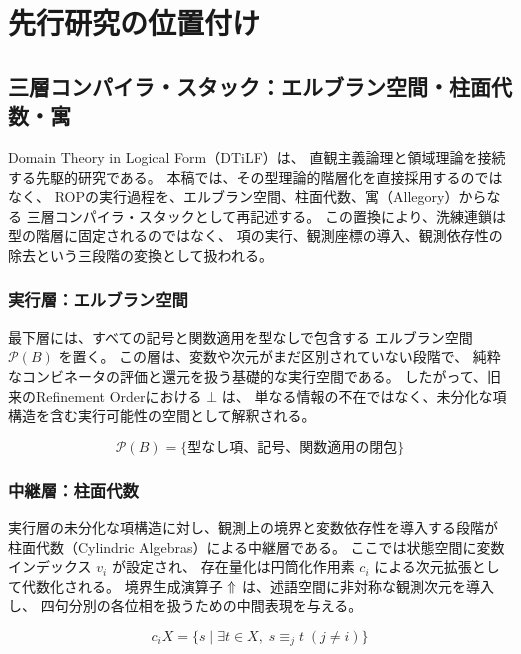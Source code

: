 \documentclass[11pt,a4paper]{ltjsarticle}
\theoremstyle{definition}
\begin{document}
\section{先行研究の位置付け}

\subsection{三層コンパイラ・スタック：エルブラン空間・柱面代数・寓}

Domain Theory in Logical Form（DTiLF）\cite{Abramsky1991}は、
直観主義論理と領域理論を接続する先駆的研究である。
本稿では、その型理論的階層化を直接採用するのではなく、
ROPの実行過程を、エルブラン空間、柱面代数、寓（Allegory）からなる
三層コンパイラ・スタックとして再記述する。
この置換により、洗練連鎖は型の階層に固定されるのではなく、
項の実行、観測座標の導入、観測依存性の除去という三段階の変換として扱われる。

\subsubsection{実行層：エルブラン空間}

最下層には、すべての記号と関数適用を型なしで包含する
エルブラン空間 $\mathcal{P}(B)$ を置く。
この層は、変数や次元がまだ区別されていない段階で、
純粋なコンビネータの評価と還元を扱う基礎的な実行空間である。
したがって、旧来のRefinement Orderにおける $\bot$ は、
単なる情報の不在ではなく、未分化な項構造を含む実行可能性の空間として解釈される。

\begin{equation}
\mathcal{P}(B) = \{\text{型なし項、記号、関数適用の閉包}\}
\end{equation}

\subsubsection{中継層：柱面代数}

実行層の未分化な項構造に対し、観測上の境界と変数依存性を導入する段階が
柱面代数（Cylindric Algebras）による中継層である。
ここでは状態空間に変数インデックス $v_i$ が設定され、
存在量化は円筒化作用素 $c_i$ による次元拡張として代数化される。
境界生成演算子 $\Uparrow$ は、述語空間に非対称な観測次元を導入し、
四句分別の各位相を扱うための中間表現を与える。

\begin{equation}
c_i X = \{s \mid \exists t \in X,\; s \equiv_j t \; (j \neq i)\}
\end{equation}
\end{document}
